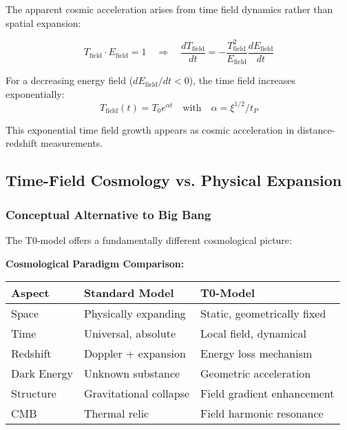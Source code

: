 \documentclass[12pt,a4paper]{article}
\theoremstyle{definition}
\begin{document}
The apparent cosmic acceleration arises from time field dynamics rather than spatial expansion:

\begin{equation}
	T_{\text{field}} \cdot E_{\text{field}} = 1 \quad \Rightarrow \quad \frac{dT_{\text{field}}}{dt} = -\frac{T_{\text{field}}^2}{E_{\text{field}}} \frac{dE_{\text{field}}}{dt}
\end{equation}

For a decreasing energy field ($dE_{\text{field}}/dt < 0$), the time field increases exponentially:
\begin{equation}
	T_{\text{field}}(t) = T_0 e^{\alpha t} \quad \text{with} \quad \alpha = \xi^{1/2}/t_P
\end{equation}

This exponential time field growth appears as cosmic acceleration in distance-redshift measurements.

\subsection{Time-Field Cosmology vs. Physical Expansion}

\subsubsection{Conceptual Alternative to Big Bang}

The T0-model offers a fundamentally different cosmological picture:

\noindent
\textbf{Cosmological Paradigm Comparison:}

\begin{center}
	\begin{tabular}{lll}
		\toprule
		\textbf{Aspect} & \textbf{Standard Model} & \textbf{T0-Model} \\
		\midrule
		Space & Physically expanding & Static, geometrically fixed \\
		Time & Universal, absolute & Local field, dynamical \\
		Redshift & Doppler + expansion & Energy loss mechanism \\
		Dark Energy & Unknown substance & Geometric acceleration \\
		Structure & Gravitational collapse & Field gradient enhancement \\
		CMB & Thermal relic & Field harmonic resonance \\
		\bottomrule
	\end{tabular}
\end{center}
\end{document}
